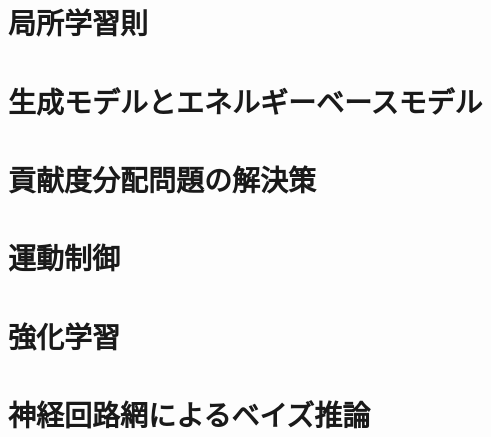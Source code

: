 \documentclass[titlepage]{ltjsbook}
\begin{document}
\chapter{局所学習則}
% 
% 
% 

\chapter{生成モデルとエネルギーベースモデル}

\chapter{貢献度分配問題の解決策}
% 
% 
% 
% 
% 

\chapter{運動制御}

\chapter{強化学習}

\chapter{神経回路網によるベイズ推論}
% 
% 
% 
% 
\backmatter
\printindex
\end{document}
